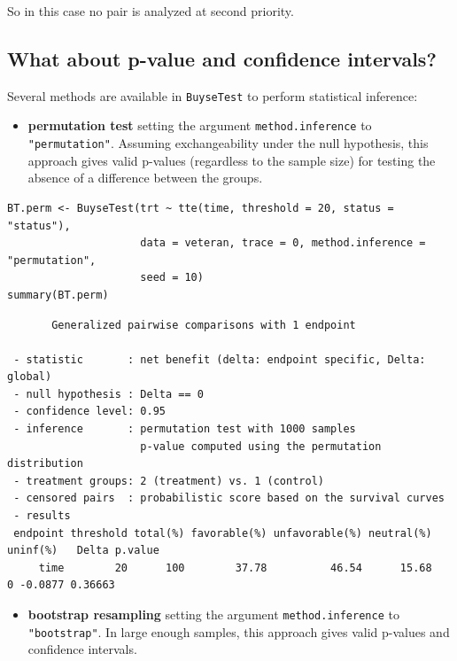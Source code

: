 \documentclass[12pt]{article}
\begin{document}
So in this case no pair is analyzed at second priority.

\clearpage

\subsection{What about p-value and confidence intervals?}
\label{sec:orga9f3e6d}

Several methods are available in \texttt{BuyseTest} to perform statistical inference:
\begin{itemize}
\item \textbf{permutation test} setting the argument \texttt{method.inference} to
\texttt{"permutation"}. Assuming exchangeability under the null hypothesis,
this approach gives valid p-values (regardless to the sample size)
for testing the absence of a difference between the groups.
\end{itemize}
\lstset{language=r,label= ,caption= ,captionpos=b,numbers=none}
\begin{lstlisting}
BT.perm <- BuyseTest(trt ~ tte(time, threshold = 20, status = "status"),
                     data = veteran, trace = 0, method.inference = "permutation",
                     seed = 10) 
summary(BT.perm)
\end{lstlisting}

\begin{verbatim}
       Generalized pairwise comparisons with 1 endpoint

 - statistic       : net benefit (delta: endpoint specific, Delta: global) 
 - null hypothesis : Delta == 0 
 - confidence level: 0.95 
 - inference       : permutation test with 1000 samples 
                     p-value computed using the permutation distribution 
 - treatment groups: 2 (treatment) vs. 1 (control) 
 - censored pairs  : probabilistic score based on the survival curves
 - results
 endpoint threshold total(%) favorable(%) unfavorable(%) neutral(%) uninf(%)   Delta p.value 
     time        20      100        37.78          46.54      15.68        0 -0.0877 0.36663
\end{verbatim}

\begin{itemize}
\item \textbf{bootstrap resampling} setting the argument \texttt{method.inference} to
\texttt{"bootstrap"}. In large enough samples, this approach gives valid
p-values and confidence intervals.
\end{itemize}
\end{document}
